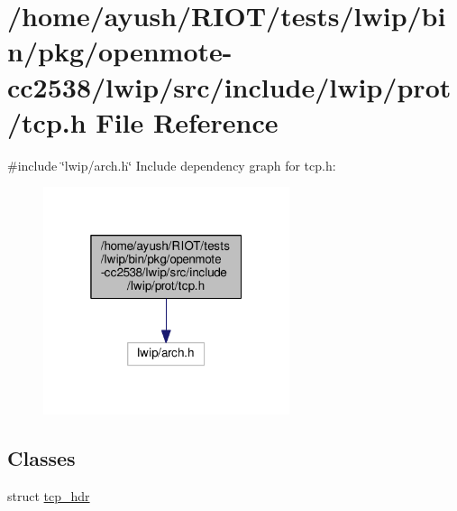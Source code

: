 \hypertarget{openmote-cc2538_2lwip_2src_2include_2lwip_2prot_2tcp_8h}{}\section{/home/ayush/\+R\+I\+O\+T/tests/lwip/bin/pkg/openmote-\/cc2538/lwip/src/include/lwip/prot/tcp.h File Reference}
\label{openmote-cc2538_2lwip_2src_2include_2lwip_2prot_2tcp_8h}
{\ttfamily \#include \char`\"{}lwip/arch.\+h\char`\"{}}\newline
Include dependency graph for tcp.\+h\+:
\nopagebreak
\begin{figure}[H]
\begin{center}
\leavevmode
\includegraphics[width=205pt]{openmote-cc2538_2lwip_2src_2include_2lwip_2prot_2tcp_8h__incl}
\end{center}
\end{figure}
\subsection*{Classes}
\begin{DoxyCompactItemize}
\item 
struct \hyperlink{structtcp__hdr}{tcp\+\_\+hdr}
\end{DoxyCompactItemize}
